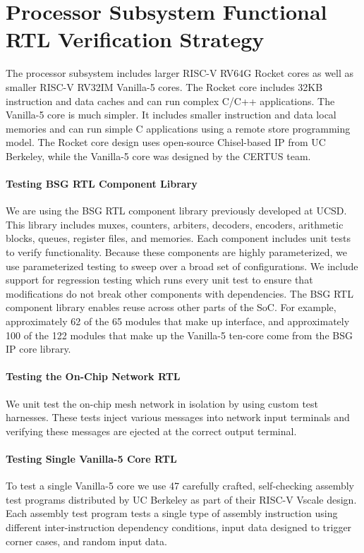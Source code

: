 
\section{Processor Subsystem Functional RTL Verification Strategy}

The processor subsystem includes larger RISC-V RV64G Rocket cores as well
as smaller RISC-V RV32IM Vanilla-5 cores. The Rocket core includes 32KB
instruction and data caches and can run complex C/C++ applications. The
Vanilla-5 core is much simpler. It includes smaller instruction and data
local memories and can run simple C applications using a remote store
programming model. The Rocket core design uses open-source Chisel-based
IP from UC Berkeley, while the Vanilla-5 core was designed by the CERTUS
team.

\paragraph{Testing BSG RTL Component Library}
We are using the BSG RTL component library previously developed at UCSD.
This library includes muxes, counters, arbiters, decoders, encoders,
arithmetic blocks, queues, register files, and memories. Each component
includes unit tests to verify functionality. Because these components are
highly parameterized, we use parameterized testing to sweep over a broad
set of configurations. We include support for regression testing which
runs every unit test to ensure that modifications do not break other
components with dependencies. The BSG RTL component library enables reuse
across other parts of the SoC. For example, approximately 62 of the 65
modules that make up  interface, and approximately 100 of
the 122 modules that make up the Vanilla-5 ten-core come from the BSG IP
core library.

\paragraph{Testing the On-Chip Network RTL}
We unit test the on-chip mesh network in isolation by using custom test
harnesses. These tests inject various messages into network input
terminals and verifying these messages are ejected at the correct output
terminal.

\paragraph{Testing Single Vanilla-5 Core RTL}
To test a single Vanilla-5 core we use 47 carefully crafted,
self-checking assembly test programs distributed by UC Berkeley as part
of their RISC-V Vscale design. Each assembly test program tests a single
type of assembly instruction using different inter-instruction dependency
conditions, input data designed to trigger corner cases, and random input
data.

